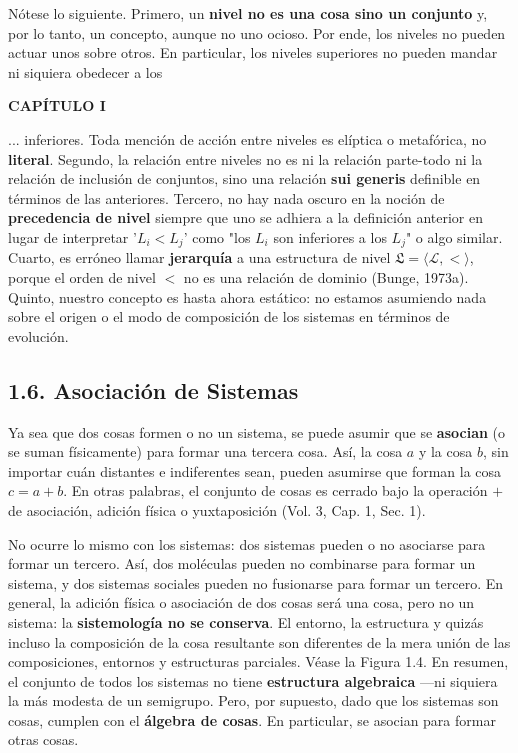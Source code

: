 {Nótese lo siguiente. Primero, un \textbf{nivel no es una cosa sino un conjunto} y, por lo tanto, un concepto, aunque no uno ocioso. Por ende, los niveles no pueden actuar unos sobre otros. En particular, los niveles superiores no pueden mandar ni siquiera obedecer a los
}
\newpage
\fancyhf{}
\fancyhead[L]{\thepage} 
\begin{center}
{\fontsize{13}{16}\selectfont \textbf{CAPÍTULO I}}
\end{center}
\vspace{0.5cm}

{\fontsize{13}{15}\selectfont
... inferiores. Toda mención de acción entre niveles es elíptica o metafórica, no \textbf{literal}. Segundo, la relación entre niveles no es ni la relación parte-todo ni la relación de inclusión de conjuntos, sino una relación \textbf{sui generis} definible en términos de las anteriores. Tercero, no hay nada oscuro en la noción de \textbf{precedencia de nivel} siempre que uno se adhiera a la definición anterior en lugar de interpretar '$L_i < L_j$' como "los $L_i$ son inferiores a los $L_j$" o algo similar. Cuarto, es erróneo llamar \textbf{jerarquía} a una estructura de nivel $\mathfrak{L} = \langle \mathcal{L}, < \rangle$, porque el orden de nivel $<$ no es una relación de dominio (Bunge, 1973a). Quinto, nuestro concepto es hasta ahora estático: no estamos asumiendo nada sobre el origen o el modo de composición de los sistemas en términos de evolución.

\subsection*{1.6. Asociación de Sistemas}
Ya sea que dos cosas formen o no un sistema, se puede asumir que se \textbf{asocian} (o se suman físicamente) para formar una tercera cosa. Así, la cosa $a$ y la cosa $b$, sin importar cuán distantes e indiferentes sean, pueden asumirse que forman la cosa $c = a + b$. En otras palabras, el conjunto de cosas es cerrado bajo la operación $+$ de asociación, adición física o yuxtaposición (Vol. 3, Cap. 1, Sec. 1).

No ocurre lo mismo con los sistemas: dos sistemas pueden o no asociarse para formar un tercero. Así, dos moléculas pueden no combinarse para formar un sistema, y dos sistemas sociales pueden no fusionarse para formar un tercero. En general, la adición física o asociación de dos cosas será una cosa, pero no un sistema: la \textbf{sistemología no se conserva}. El entorno, la estructura y quizás incluso la composición de la cosa resultante son diferentes de la mera unión de las composiciones, entornos y estructuras parciales. Véase la Figura 1.4. En resumen, el conjunto de todos los sistemas no tiene \textbf{estructura algebraica} —ni siquiera la más modesta de un semigrupo. Pero, por supuesto, dado que los sistemas son cosas, cumplen con el \textbf{álgebra de cosas}. En particular, se asocian para formar otras cosas.

}
